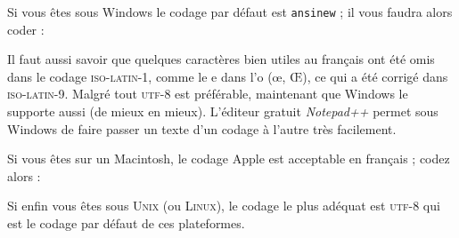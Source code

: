 \documentclass[a4paper,12pt,openright]{article}
\begin{document}
Si vous êtes sous Windows le codage par défaut est \texttt{ansinew} ; il vous
faudra alors coder :
\begin{center}
\end{center}
\begin{MAJ}
Il faut aussi savoir que quelques caractères bien utiles au français
ont été omis dans le codage \textsc{iso-latin-1}, comme le e dans l'o (œ, Œ),
ce qui a été corrigé dans \textsc{iso-latin-9}. 
Malgré tout \textsc{utf-8} est préférable, maintenant que Windows
le supporte aussi (de mieux en mieux). L'éditeur gratuit \textit{Notepad++} 
permet sous Windows de faire passer un texte d'un codage à l'autre très facilement.
\end{MAJ}

Si vous êtes sur un Macintosh, le codage Apple est acceptable en français ;
codez alors :
\begin{center}
\end{center}
\begin{MAJ}
Si enfin vous êtes sous \textsc{Unix} (ou \textsc{Linux}), le codage le plus adéquat est \textsc{utf-8}
qui est le codage par défaut de ces plateformes.
\end{MAJ}

\end{document}
